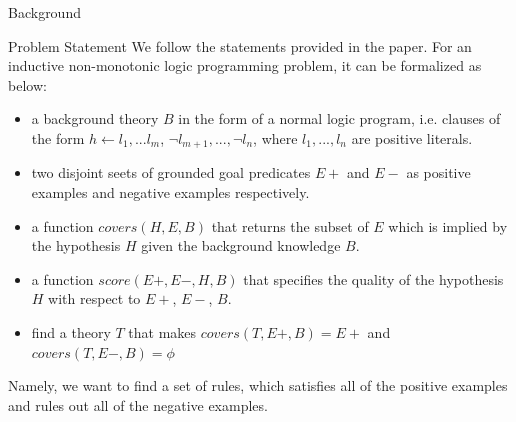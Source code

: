 \documentclass[12pt,a4paper]{article}
\begin{document}
	\begin{section}{Background}
		\begin{subsection}{Problem Statement}
			We follow the statements provided in the paper. For an inductive non-monotonic logic programming problem, it can be formalized as below:\\
			
			\begin{itemize}
				\item {a background theory $B$ in the form of a normal logic program, i.e. clauses of the form $h\leftarrow l_1, ... l_m$, $\neg l_{m+1},...,\neg l_n$, where $l_1,...,l_n$ are positive literals.}
				\item {two disjoint seets of grounded goal predicates $E+$ and $E-$ as positive examples and negative examples respectively.}
				\item {a function $covers(H,E,B)$ that returns the subset of $E$ which is implied by the hypothesis $H$ given the background knowledge $B$.}
				\item {a function $score(E+,E-,H,B)$ that specifies the quality of the hypothesis $H$ with respect to $E+$, $E-$, $B$.}
			\end{itemize}
				\begin{itemize}
					\item {find a theory $T$ that makes $covers(T,E+,B)=E+$ and $covers(T,E-,B)=\phi$}
				\end{itemize}

			Namely, we want to find a set of rules, which satisfies all of the positive examples and rules out all of the negative examples.
		\end{subsection}


\end{section}
\end{document}
